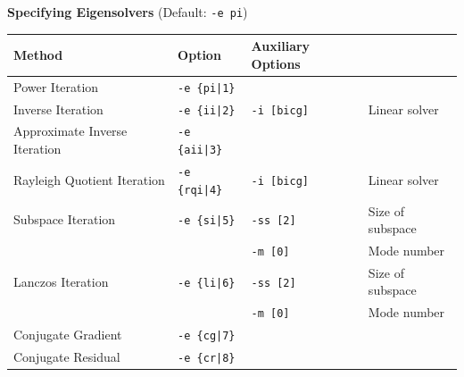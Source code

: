\documentclass[a4paper]{article}
\begin{document}
\begin{minipage}[t]{\textwidth}
\begin{center}
{\bf Specifying Eigensolvers} (Default: \verb=-e pi=) \\
\begin{tabular}{l|lll}\hline\hline
 Method      & Option              &  Auxiliary Options  & \\ \hline
\hline
 Power Iteration                             & \verb=-e {pi|1}=        &    \\ 
 Inverse Iteration                           & \verb=-e {ii|2}=        & \verb=-i [bicg]= & Linear solver \\
 Approximate Inverse Iteration               & \verb=-e {aii|3}=       & \\
 Rayleigh Quotient Iteration                 & \verb=-e {rqi|4}=       & \verb=-i [bicg]= & Linear solver \\
 Subspace Iteration                          & \verb=-e {si|5}=        &    \verb=-ss [2]= & Size of subspace \\
                                             &                         &
 \verb=-m [0]= & Mode number\\
 Lanczos Iteration                           & \verb=-e {li|6}=        &    \verb=-ss [2]= & Size of subspace \\
                                             &                         &
 \verb=-m [0]= & Mode number\\
 Conjugate Gradient                          & \verb=-e {cg|7}=        &    \\
 Conjugate Residual                          & \verb=-e {cr|8}=        &    \\
\hline         
\end{tabular}
\end{center}
\end{minipage}
\\ \\
\end{document}
